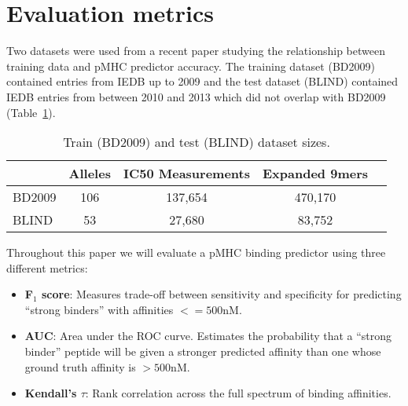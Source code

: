 \section{Evaluation metrics}

Two datasets were used from a recent paper studying the relationship between training data and pMHC predictor accuracy\cite{Kim_2014}. The training dataset (BD2009) contained entries from IEDB\cite{Salimi_2012} up to 2009 and the test dataset (BLIND) contained IEDB entries from between 2010 and 2013 which did not overlap with BD2009 (Table~\ref{tab:datasets}).

\begin{table}[h!]
\centering
\begin{tabular}{l||cccc}
\toprule
{} & Alleles &  IC50 Measurements & Expanded 9mers \\
\midrule
BD2009 &     106 &                           137,654 &        470,170 \\
BLIND  &      53 &                           27,680 &         83,752 \\
\bottomrule
\end{tabular}
\caption{Train (BD2009) and test (BLIND) dataset sizes.}
\label{tab:datasets}
\end{table}

Throughout this paper we will evaluate a pMHC binding predictor using three different metrics:

\begin{itemize}
\item {\bf F$_1$ score}: Measures trade-off between sensitivity and specificity for predicting ``strong binders'' with affinities $<= 500$nM. 
\item {\bf AUC}: Area under the ROC curve. Estimates the probability that a ``strong binder'' peptide will be given a stronger predicted affinity than one whose ground truth affinity is $>500$nM. 
\item {\bf Kendall's $\tau$}: Rank correlation across the full spectrum of binding affinities.
\end{itemize}

